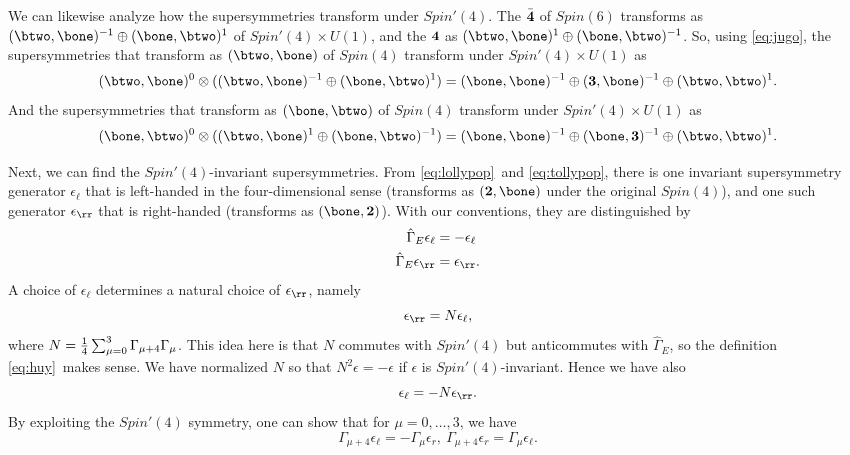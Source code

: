 \par{}

We can likewise analyze how the supersymmetries transform under
$Spin'(4)$. The $\bar{\bf 4}$ of $Spin(6)$ transforms as
$(\btwo,\bone)^{-1}\oplus (\bone,\btwo)^{1}$ of $Spin'(4)\times
U(1)$, and the ${\bf  4}$ as $(\btwo,\bone)^{1}\oplus
(\bone,\btwo)^{-1}$. So, using \eqref{eq:jugo}, the supersymmetries that
transform as $(\btwo,\bone)$ of $Spin(4)$ transform under
$Spin'(4)\times U(1)$ as %
\setcounter{equation}{4}
\begin{equation}\label{eq:lollypop}
(\btwo,\bone)^0\otimes
((\btwo,\bone)^{-1}\oplus (\bone,\btwo)^{1}) =
(\bone,\bone)^{-1}\oplus ({\bf 3},\bone)^{-1}
\oplus(\btwo,\btwo)^{1}.
\end{equation}
 And the supersymmetries that transform
as $(\bone,\btwo)$ of $Spin(4)$ transform under $Spin'(4)\times
U(1)$ as %
\setcounter{equation}{5}
\begin{equation}\label{eq:tollypop}
(\bone,\btwo)^0\otimes
((\btwo,\bone)^{1}\oplus (\bone,\btwo)^{-1}) = (\bone,\bone)^{-1}
\oplus (\bone,{\bf 3})^{-1} \oplus(\btwo,\btwo)^{1}.
\end{equation}

Next, we can find the $Spin'(4)$-invariant supersymmetries. {}From
\eqref{eq:lollypop}\ and \eqref{eq:tollypop}, there is one invariant supersymmetry
generator $\epsilon_\ell$ that is left-handed in the
four-dimensional sense (transforms as $({\bf 2},\bone)$ under the
original $Spin(4)$), and one such generator $\epsilon_\rr$ that is
right-handed (transforms as $(\bone,{\bf 2})$). With our
conventions, they are distinguished by
\setcounter{equation}{6}
\begin{equation}\label{eq:onog}
\begin{aligned}\hat\Gamma_E\epsilon_\ell& = -\epsilon_\ell\\
\hat\Gamma_E\epsilon_\rr& = \epsilon_\rr.\\\end{aligned}
\end{equation}
 A choice of
$\epsilon_\ell$ determines a natural choice of $\epsilon_\rr$,
namely %
\setcounter{equation}{7}
\begin{equation}\label{eq:huy}
\epsilon_\rr=N\epsilon_\ell,
\end{equation}
 where $N={1\over
4}\sum_{\mu=0}^3\Gamma_{\mu+4}\Gamma_{\mu}$. This idea here is
that $N$ commutes with $Spin'(4)$ but anticommutes with
$\hat\Gamma_E$, so the definition \eqref{eq:huy}\ makes sense.  We have
normalized $N$ so that $N^2\epsilon=-\epsilon$ if $\epsilon$ is
$Spin'(4)$-invariant. Hence we have also
\setcounter{equation}{8}
\begin{equation}\label{eq:uy}
\epsilon_\ell=-N\epsilon_\rr.
\end{equation}
 By exploiting the
$Spin'(4)$ symmetry, one can show that for $\mu=0,\dots,3$, we
have %
\setcounter{equation}{9}
\begin{equation}\label{eq:uzu}
\Gamma_{\mu+4}\epsilon_\ell =
-\Gamma_\mu\epsilon_r,~\Gamma_{\mu+4}\epsilon_r=\Gamma_\mu\epsilon_\ell.
\end{equation}

